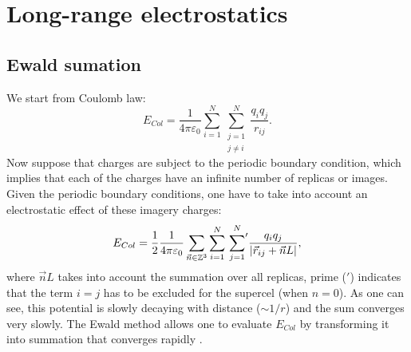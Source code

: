 \documentclass[11pt]{book}
\begin{document}

\section{Long-range electrostatics}


\subsection{Ewald sumation}
We start from Coulomb law:
\begin{equation}\label{eq:ewald-1}
E_{Col}=\frac{1}{4\pi\varepsilon_{0}}\sum_{i=1}^{N}\sum_{\substack{j=1\\j\ne i}}^{N}\frac{q_{i}q_{j}}{r_{ij}}.
\end{equation}
Now suppose that charges are subject to the periodic boundary condition, which implies that each of the charges have an infinite number of replicas or images. Given the periodic boundary conditions, one have to take into account an electrostatic effect of these imagery charges:
\begin{equation}\label{eq:ewald-2}
E_{Col}=\frac{1}{2}\frac{1}{4\pi\varepsilon_{0}}\sum_{\vec{n}\in\mathbb{Z}^{3}}\sum_{i=1}^{N}{\sideset{}{'}\sum_{\substack{j=1}}^{N}}\frac{q_{i}q_{j}}{|\vec{r}_{ij}+\vec{n}L|},
\end{equation}
where $\vec{n}L$ takes into account the summation over all replicas, prime ($'$) indicates that the term $i=j$ has to be excluded for the supercel (when $n=0$). As one can see, this potential is slowly decaying with distance ($\sim1/r$) and the sum converges very slowly. The Ewald method allows one to evaluate $E_{Col}$ by transforming it into summation that converges rapidly \cite{EwaldPhysik21,LeeOnline09,SaguiARBBS99}.


\end{document}
